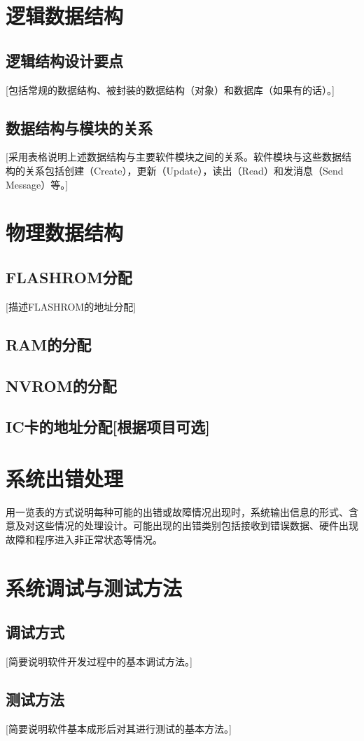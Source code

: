 \documentclass[10pt,a4paper,titlepage]{article} %
\begin{document}
\section{逻辑数据结构}
\subsection{逻辑结构设计要点}
[包括常规的数据结构、被封装的数据结构（对象）和数据库（如果有的话）。]\newline
\subsection{数据结构与模块的关系}
[采用表格说明上述数据结构与主要软件模块之间的关系。软件模块与这些数据结构的关系包括创建（Create），更新（Update），读出（Read）和发消息（Send Message）等。]\newline
\section{物理数据结构}
\subsection{FLASHROM分配}
[描述FLASHROM的地址分配]\newline
\subsection{RAM的分配}
\subsection{NVROM的分配}
\subsection{IC卡的地址分配[根据项目可选]}
\section{系统出错处理}
用一览表的方式说明每种可能的出错或故障情况出现时，系统输出信息的形式、含意及对这些情况的处理设计。可能出现的出错类别包括接收到错误数据、硬件出现故障和程序进入非正常状态等情况。\newline
\section{系统调试与测试方法}
\subsection{调试方式}
[简要说明软件开发过程中的基本调试方法。]\newline
\subsection{测试方法}
[简要说明软件基本成形后对其进行测试的基本方法。]
\end{document}
